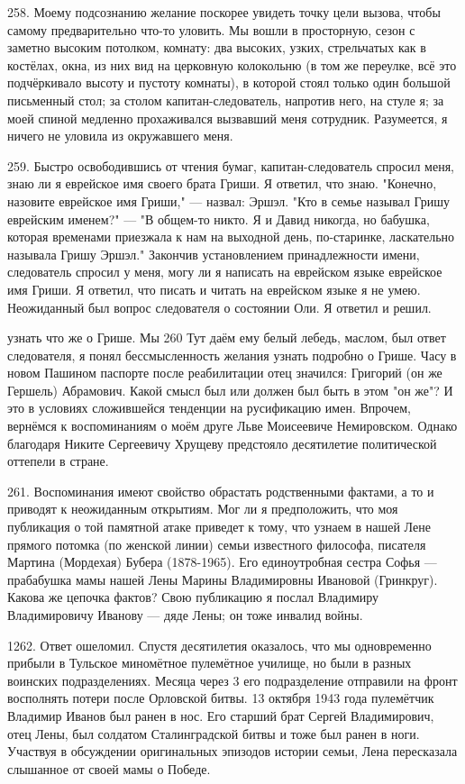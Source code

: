 258.
Моему подсознанию желание поскорее увидеть точку цели вызова, чтобы самому предварительно что-то уловить. Мы вошли в просторную, сезон с заметно высоким потолком, комнату: два высоких, узких, стрельчатых как в костёлах, окна, из них вид на церковную колокольню (в том же переулке, всё это подчёркивало высоту и пустоту комнаты), в которой стоял только один большой письменный стол; за столом капитан-следователь, напротив него, на стуле я; за моей спиной медленно прохаживался вызвавший меня сотрудник. Разумеется, я ничего не уловила из окружавшего меня.

259. Быстро освободившись от чтения бумаг, капитан-следователь спросил меня, знаю ли я еврейское имя своего брата Гриши. Я ответил, что знаю. "Конечно, назовите еврейское имя Гриши," — назвал: Эршэл. "Кто в семье называл Гришу еврейским именем?" — "В общем-то никто. Я и Давид никогда, но бабушка, которая временами приезжала к нам на выходной день, по-старинке, ласкательно называла Гришу Эршэл." Закончив установлением принадлежности имени, следователь спросил у меня, могу ли я написать на еврейском языке еврейское имя Гриши. Я ответил, что писать и читать на еврейском языке я не умею. Неожиданный был вопрос следователя о состоянии Оли. Я ответил и решил.

узнать что же о Грише. Мы 260 Тут даём ему белый лебедь, маслом, был ответ следователя, я понял бессмысленность желания узнать подробно о Грише. Часу в новом Пашином паспорте после реабилитации отец значился: Григорий (он же Гершель) Абрамович. Какой смысл был или должен был быть в этом "он же"? И это в условиях сложившейся тенденции на русификацию имен. Впрочем, вернёмся к воспоминаниям о моём друге Льве Моисеевиче Немировском. Однако благодаря Никите Сергеевичу Хрущеву предстояло десятилетие политической оттепели в стране.

261. Воспоминания имеют свойство обрастать родственными фактами, а то и приводят к неожиданным открытиям. Мог ли я предположить, что моя публикация о той памятной атаке приведет к тому, что узнаем в нашей Лене прямого потомка (по женской линии) семьи известного философа, писателя Мартина (Мордехая) Бубера (1878-1965). Его единоутробная сестра Софья — прабабушка мамы нашей Лены Марины Владимировны Ивановой (Гринкруг). Какова же цепочка фактов? Свою публикацию я послал Владимиру Владимировичу Иванову — дяде Лены; он тоже инвалид войны.

1262.
Ответ ошеломил. Спустя десятилетия оказалось, что мы одновременно прибыли в Тульское миномётное пулемётное училище, но были в разных воинских подразделениях. Месяца через 3 его подразделение отправили на фронт восполнять потери после Орловской битвы. 13 октября 1943 года пулемётчик Владимир Иванов был ранен в нос. Его старший брат Сергей Владимирович, отец Лены, был солдатом Сталинградской битвы и тоже был ранен в ноги. Участвуя в обсуждении оригинальных эпизодов истории семьи, Лена пересказала слышанное от своей мамы о Победе.

